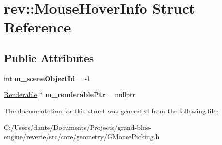 \hypertarget{structrev_1_1_mouse_hover_info}{}\section{rev\+::Mouse\+Hover\+Info Struct Reference}
\label{structrev_1_1_mouse_hover_info}
\subsection*{Public Attributes}
\begin{DoxyCompactItemize}
\item 
\mbox{\label{structrev_1_1_mouse_hover_info_a2989d273c84ef154a1ce2534b486f903}} 
int {\bfseries m\+\_\+scene\+Object\+Id} = -\/1
\item 
\mbox{\label{structrev_1_1_mouse_hover_info_a502ba34c8fa7e43ae19ebc516de00328}} 
\mbox{\hyperlink{classrev_1_1_renderable}{Renderable}} $\ast$ {\bfseries m\+\_\+renderable\+Ptr} = nullptr
\end{DoxyCompactItemize}


The documentation for this struct was generated from the following file\+:\begin{DoxyCompactItemize}
\item 
C\+:/\+Users/dante/\+Documents/\+Projects/grand-\/blue-\/engine/reverie/src/core/geometry/G\+Mouse\+Picking.\+h\end{DoxyCompactItemize}
